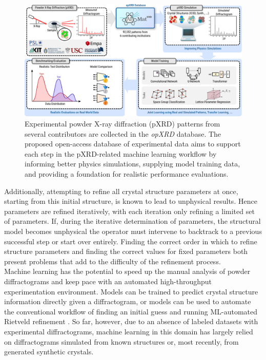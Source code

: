 \begin{figure}[!b]
    \centering
    \includegraphics[width=1.0\linewidth]{figures/pipeline.pdf}
    \caption{Experimental powder X-ray diffraction (pXRD) patterns from several contributors are collected in the \textit{opXRD} database. The proposed open-access database of experimental data aims to support each step in the pXRD-related machine learning workflow by informing better physics simulations, supplying model training data, and providing a foundation for realistic performance evaluations.}
    \label{fig:overview}
\end{figure}

Additionally, attempting to refine all crystal structure parameters at once, starting from this initial structure, is known to lead to unphysical results\cite{Ozaki2020}. Hence parameters are refined iteratively, with each iteration only refining a limited set of parameters. If, during the iterative determination of parameters, the structural model becomes unphysical the operator must intervene to backtrack to a previous successful step or start over entirely. Finding the correct order in which to refine structure parameters and finding the correct values for fixed parameters both present problems that add to the difficulty of the refinement process.\\

Machine learning has the potential to speed up the manual analysis of powder diffractograms and keep pace with an automated high-throughput experimentation environment\cite{Agrawal2019, Surdu2023}.
Models can be trained to predict crystal structure information directly given a diffractogram, or models can be used to automate the conventional workflow of finding an initial guess \cite{Surdu2023} and running ML-automated Rietveld refinement \cite{Feng2019}.
So far, however, due to an absence of labeled datasets with experimental diffractograms\cite{Wang2020}, machine learning in this domain has largely relied on diffractograms simulated from known structures\cite{Park2017, Lee2023} or, most recently, from generated synthetic crystals\cite{Schopmans2023}. \\

